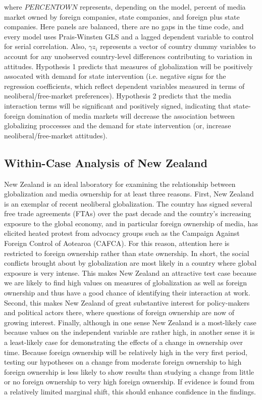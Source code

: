\documentclass[12pt]{report}
\begin{document}
	where $PERCENTOWN$ represents, depending on the model, percent of media market owned by foreign companies, state companies, and foreign plus state companies. Here panels are balanced, there are no gaps in the time code, and every model uses Prais-Winsten GLS and a lagged dependent variable to control for serial correlation. Also, $\gamma z_i$ represents a vector of country dummy variables to account for any unobserved country-level differences contributing to variation in attitudes.
	Hypothesis 1 predicts that measures of globalization will be positively assocated with demand for state intervention (i.e. negative signs for the regression coefficients, which reflect dependent variables measured in terms of neoliberal/free-market preferences). Hypothesis 2 predicts that the media interaction terms will be significant and positively signed, indicating that state-foreign domination of media markets will decrease the association between globalizing proccesses and the demand for state intervention (or, increase neoliberal/free-market attitudes).

\subsection{Within-Case Analysis of New Zealand}
	New Zealand is an ideal laboratory for examining the relationship between globalization and media ownership for at least three reasons. First, New Zealand is an exemplar of recent neoliberal globalization. The country has signed several free trade agreements (FTAs) over the past decade and the country's increasing exposure to the global economy, and in particular foreign ownership of media, has elicited heated protest from advocacy groups such as the Campaign Against Foreign Control of Aotearoa (CAFCA). For this reason, attention here is restricted to foreign ownership rather than state ownership. In short, the social conflicts brought about by globalization are most likely in a country where global exposure is very intense. This makes New Zealand an attractive test case because we are likely to find high values on measures of globalization as well as foreign ownership and thus have a good chance of identifying their interaction at work. Second, this makes New Zealand of great substantive interest for policy-makers and political actors there, where questions of foreign ownership are now of growing interest. Finally, although in one sense New Zealand is a most-likely case because values on the independent variable are rather high, in another sense it is a least-likely case for demonstrating the effects of a change in ownership over time. Because foreign ownership will be relatively high in the very first period, testing our hypotheses on a change from moderate foreign ownership to high foreign ownership is less likely to show results than studying a change from little or no foreign ownership to very high foreign ownership. If evidence is found from a relatively limited marginal shift, this should enhance confidence in the findings.
		
\end{document}
